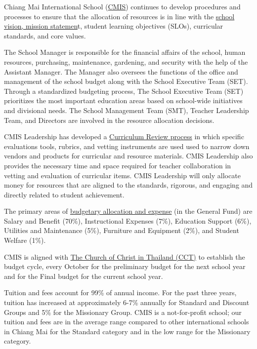 \begin{findings}
Chiang Mai International School (\href{http://cmis.ac.th/}{CMIS}) continues to develop procedures and processes to ensure that the allocation of resources is in line with the \href{http://cmis.ac.th/about/vision}{school vision, mission statemen}t, student learning objectives (SLOs), curricular standards, and core values. 

The School Manager is responsible for the financial affairs of the school, human resources, purchasing, maintenance, gardening, and security with the help of the Assistant Manager. The Manager also oversees the functions of the office and management of the school budget along with the School Executive Team (SET). Through a standardized budgeting process, The School Executive Team (SET) prioritizes the most important education areas based on school-wide initiatives and divisional needs. The School Management Team (SMT), Teacher Leadership Team, and Directors are involved in the resource allocation decisions. 

CMIS Leadership has developed a \href{https://docs.google.com/document/d/1hh1nLUlJgg1hd7s6aG3u3We0L6o7Wg_ECdjc2f6DcT8/edit}{Curriculum Review process} in which specific evaluations tools, rubrics, and vetting instruments are used used to narrow down vendors and products for curricular and resource materials. CMIS Leadership also provides the necessary time and space required for teacher collaboration in vetting and evaluation of curricular items. CMIS Leadership will only allocate money for resources that are aligned to the standards, rigorous, and engaging and directly related to student achievement.  

The primary areas of \href{https://drive.google.com/a/cmis.ac.th/file/d/0B-CVlEN-TDChaEYxLWdWdHhqM3J6RzdGVlpFYmhIZnRvR3J3/view?usp=sharing}{budgetary allocation and expense} (in the General Fund) are Salary and Benefit (70\%), Instructional Expenses (7\%), Education Support (6\%), Utilities and Maintenance (5\%), Furniture and Equipment (2\%), and Student Welfare (1\%). 

CMIS is aligned with \href{https://drive.google.com/a/cmis.ac.th/file/d/0B-CVlEN-TDChaEYxLWdWdHhqM3J6RzdGVlpFYmhIZnRvR3J3/view?usp=sharing}{The Church of Christ in Thailand (CCT)} to establish the budget cycle, every October for the preliminary budget for the next school year and for the Final budget for the current school year.

Tuition and fees account for 99\% of annual income. For the past three years, tuition has increased at approximately 6-7\% annually for Standard and Discount Groups and 5\% for the Missionary Group. CMIS is a not-for-profit school; our tuition and fees are in the average range compared to other international schools in Chiang Mai for the Standard category and in the low range for the Missionary category.


\end{findings}
